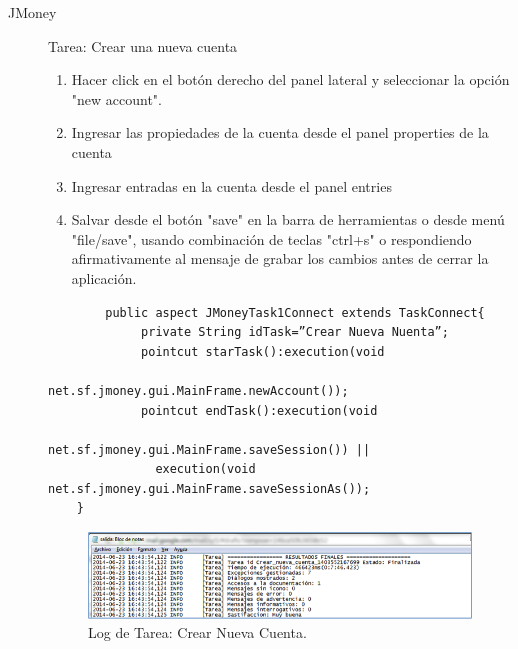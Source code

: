 \begin{description}
\item[JMoney]
Tarea: Crear una nueva cuenta
	\begin{enumerate}
		\item Hacer click en el botón derecho del panel lateral y seleccionar la opción "new account".
		\item Ingresar las propiedades de la cuenta desde el panel properties de la cuenta
		\item Ingresar entradas en la cuenta desde el panel entries  
		\item Salvar desde el botón "save" en la barra de herramientas o desde menú "file/save", usando combinación de teclas "ctrl+s" o respondiendo afirmativamente al mensaje de grabar los cambios antes de cerrar la aplicación.
	\end{enumerate}
	\begin{verbatim}
		public aspect JMoneyTask1Connect extends TaskConnect{		
		     private String idTask=”Crear Nueva Nuenta”;
		     pointcut starTask():execution(void   
		                  net.sf.jmoney.gui.MainFrame.newAccount());
		     pointcut endTask():execution(void                  
		               net.sf.jmoney.gui.MainFrame.saveSession()) || 
		       execution(void net.sf.jmoney.gui.MainFrame.saveSessionAs());
	}
	\end{verbatim}
	\begin{figure}[ht!]
		\centering
		\includegraphics[scale=1]{figs/fig5.png}
		\caption{\label{fig:fig5} Log de Tarea: Crear Nueva Cuenta.}
	\end{figure}
\end{description}